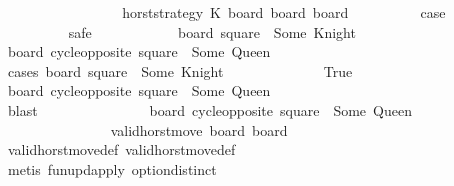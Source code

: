 \begin{isabellebody}
\ \ \ \ \ \ \isamarkupfalse%
\isanewline
\ \ \ \ \ \ \ \ \isamarkupfalse%
\ {\isacharparenleft}{}\ horst{\isacharunderscore}strategy\ K\ board\ board{\isacharprime}\ board{\isacharprime}{\isacharprime}{\isacharparenright}\isanewline
\ \ \ \ \ \ \ \ \isamarkupfalse%
\ {\isacharquery}case\isanewline
\ \ \ \ \ \ \ \ \isamarkupfalse%
\ safe\isanewline
\ \ \ \ \ \ \ \ \ \ \isamarkupfalse%
\ {\isachardoublequoteopen}board{\isacharprime}{\isacharprime}\ square\ {\isacharequal}\ Some\ Knight{\isachardoublequoteclose}\isanewline
\ \ \ \ \ \ \ \ \ \ \isamarkupfalse%
\ {\isachardoublequoteopen}board{\isacharprime}{\isacharprime}\ {\isacharparenleft}cycle{\isacharunderscore}opposite\ square{\isacharparenright}\ {\isacharequal}\ Some\ Queen{\isachardoublequoteclose}\isanewline
\ \ \ \ \ \ \ \ \ \ \isamarkupfalse%
\ {\isacharparenleft}cases\ {\isachardoublequoteopen}board\ square\ {\isacharequal}\ Some\ Knight{\isachardoublequoteclose}{\isacharparenright}\isanewline
\ \ \ \ \ \ \ \ \ \ \ \ \isamarkupfalse%
\ True\isanewline
\ \ \ \ \ \ \ \ \ \ \ \ \isamarkupfalse%
\ \isamarkupfalse%
\ {\isachardoublequoteopen}board\ {\isacharparenleft}cycle{\isacharunderscore}opposite\ square{\isacharparenright}\ {\isacharequal}\ Some\ Queen{\isachardoublequoteclose}\isanewline
\ \ \ \ \ \ \ \ \ \ \ \ \ \ \isamarkupfalse%
\ {}\isanewline
\ \ \ \ \ \ \ \ \ \ \ \ \ \ \isamarkupfalse%
\ blast\isanewline
\ \ \ \ \ \ \ \ \ \ \ \ \isamarkupfalse%
\ \isamarkupfalse%
\ {\isachardoublequoteopen}board{\isacharprime}\ {\isacharparenleft}cycle{\isacharunderscore}opposite\ square{\isacharparenright}\ {\isacharequal}\ Some\ Queen{\isachardoublequoteclose}\isanewline
\ \ \ \ \ \ \ \ \ \ \ \ \ \ \isamarkupfalse%
\ {\isacharbackquoteopen}valid{\isacharunderscore}horst{\isacharunderscore}move\ board\ board{\isacharprime}{\isacharbackquoteclose}\isanewline
\ \ \ \ \ \ \ \ \ \ \ \ \ \ \isamarkupfalse%
\ valid{\isacharunderscore}horst{\isacharunderscore}move{\isacharunderscore}def\ valid{\isacharunderscore}horst{\isacharunderscore}move{\isacharprime}{\isacharunderscore}def\isanewline
\ \ \ \ \ \ \ \ \ \ \ \ \ \ \isamarkupfalse%
\ {\isacharparenleft}metis\ fun{\isacharunderscore}upd{\isacharunderscore}apply\ option{\isachardot}distinct{\isacharparenleft}{}{\isacharparenright}{\isacharparenright}\isanewline

\end{isabellebody}
